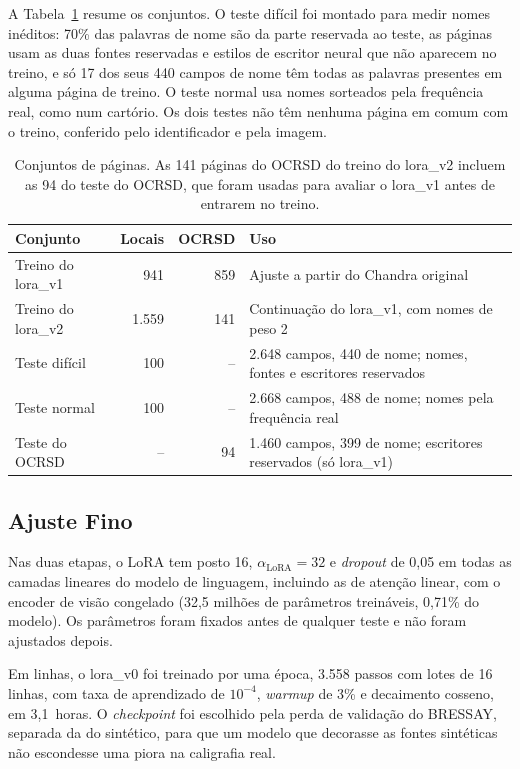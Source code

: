 \documentclass[12pt,a4paper]{article}
\begin{document}
A Tabela~\ref{tab:conjuntos-paginas} resume os conjuntos. O teste difícil foi montado para medir nomes inéditos: 70\% das palavras de nome são da parte reservada ao teste, as páginas usam as duas fontes reservadas e estilos de escritor neural que não aparecem no treino, e só 17 dos seus 440 campos de nome têm todas as palavras presentes em alguma página de treino. O teste normal usa nomes sorteados pela frequência real, como num cartório. Os dois testes não têm nenhuma página em comum com o treino, conferido pelo identificador e pela imagem.

\begin{table}[H]
\centering
\small
\begin{tabular}{@{}lrrp{7.2cm}@{}}
\toprule
Conjunto & Locais & OCRSD & Uso \\
\midrule
Treino do lora\_v1 & 941 & 859 & Ajuste a partir do Chandra original \\
Treino do lora\_v2 & 1.559 & 141 & Continuação do lora\_v1, com nomes de peso 2 \\
Teste difícil & 100 & -- & 2.648 campos, 440 de nome; nomes, fontes e escritores reservados \\
Teste normal & 100 & -- & 2.668 campos, 488 de nome; nomes pela frequência real \\
Teste do OCRSD & -- & 94 & 1.460 campos, 399 de nome; escritores reservados (só lora\_v1) \\
\bottomrule
\end{tabular}
\caption{Conjuntos de páginas. As 141 páginas do OCRSD do treino do lora\_v2 incluem as 94 do teste do OCRSD, que foram usadas para avaliar o lora\_v1 antes de entrarem no treino.}
\label{tab:conjuntos-paginas}
\end{table}

\subsection{Ajuste Fino}
\label{subsec:ajuste}

Nas duas etapas, o LoRA tem posto 16, $\alpha_{\text{LoRA}} = 32$ e \emph{dropout} de 0,05 em todas as camadas lineares do modelo de linguagem, incluindo as de atenção linear, com o encoder de visão congelado (32,5 milhões de parâmetros treináveis, 0,71\% do modelo). Os parâmetros foram fixados antes de qualquer teste e não foram ajustados depois.

Em linhas, o lora\_v0 foi treinado por uma época, 3.558 passos com lotes de 16 linhas, com taxa de aprendizado de $10^{-4}$, \emph{warmup} de 3\% e decaimento cosseno, em 3,1~horas. O \emph{checkpoint} foi escolhido pela perda de validação do BRESSAY, separada da do sintético, para que um modelo que decorasse as fontes sintéticas não escondesse uma piora na caligrafia real.
\end{document}
